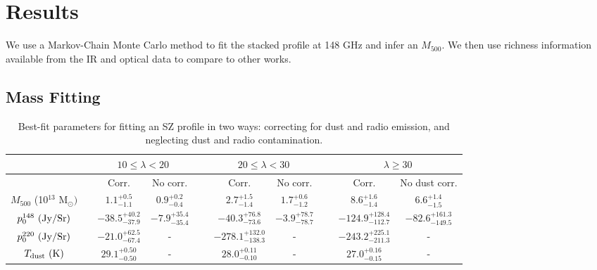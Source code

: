\documentclass[a4paper,fleqn,usenatbib]{mnras}
\begin{document}
\section{Results} \label{sec:results}

We use a Markov-Chain Monte Carlo method to fit the stacked profile at 148 GHz and infer an $M_{500}$. We then use richness information available from the IR and optical data to compare to other works.




\subsection{Mass Fitting}

\begin{table}
   
  \centering
  \caption{Best-fit parameters for fitting an SZ profile in two ways: correcting for dust and radio emission, and neglecting dust and radio contamination.}
  \begin{threeparttable}
  \begin{tabular}{|*{10}{c|}}
    \hline
    & & \multicolumn{2}{|c}{$10 \leq \lambda < 20$} & & \multicolumn{2}{|c|}{$20 \leq \lambda < 30$} & & \multicolumn{2}{|c|}{$\lambda \geq 30$}\\ \hline
    
    & & Corr. & No corr. & \ &  Corr. & No corr. & \ &  Corr. & No dust corr. \\ \hline
    
    $M_{500}$ (10$^{13}$ M$_{\odot})$ & & $1.1^{+0.5}_{-1.1}$ & $0.9^{+0.2}_{-0.4}$ & \ & $2.7^{+1.5}_{-1.4}$ & $1.7^{+0.6}_{-1.2}$ & \ & $8.6^{+1.6}_{-1.4}$ & $6.6^{+1.4}_{-1.5}$ \\ \hline
     
    $p_0^{148} \ (\rm Jy/Sr)$ & & $-38.5^{+40.2}_{-37.9}$ & $-7.9^{+35.4}_{-35.4}$ & \ & $-40.3^{+76.8}_{-73.6}$ & $-3.9^{+78.7}_{-78.7}$ & \ & $-124.9^{+128.4}_{-112.7}$ & $-82.6^{+161.3}_{-149.5}$ \\ \hline
    
    $p_0^{220} \ (\rm Jy/Sr)$ & & $-21.0^{+62.5}_{-67.4}$ & - & \ & $-278.1^{+132.0}_{-138.3}$ & - & \ & $-243.2^{+225.1}_{-211.3}$ & - \\ \hline
    
    $T_{\rm dust} \ (\rm K)$ & & $29.1^{+0.50}_{-0.50}$  & - & \ & $28.0^{+0.11}_{-0.10}$ & - & \ & $27.0^{+0.16}_{-0.15}$ & - \\ \hline 


\end{tabular}
\end{threeparttable}
\end{table}
\end{document}
